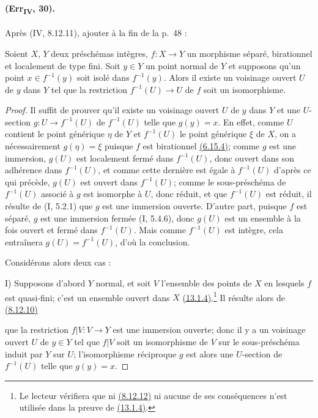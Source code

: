 \paragraph{(Err\textsubscript{IV}, 30).}
Après (IV, 8.12.11), ajouter à la fin de la p.~48 :

\begin{corollary}[8.12.12]
\label{IV.8.12.12}
Soient $X$, $Y$ deux préschémas intègres,
$f:X\to Y$ un morphisme séparé, birationnel et localement de type fini.
Soit $y\in Y$ un point normal de $Y$ et supposons qu'un point
$x\in f^{-1}(y)$ soit isolé dans $f^{-1}(y)$. Alors il existe un
voisinage ouvert $U$ de $y$ dans $Y$ tel que la restriction
$f^{-1}(U)\to U$ de $f$ soit un isomorphisme.
\end{corollary}

\begin{proof}
Il suffit de prouver qu'il existe un voisinage ouvert $U$ de $y$ dans
$Y$ et une $U$-section $g:U\to f^{-1}(U)$ de $f^{-1}(U)$ telle que
$g(y)=x$. En effet, comme $U$ contient le point générique $\eta$ de
$Y$ et $f^{-1}(U)$ le point générique $\xi$ de $X$, on a
nécessairement $g(\eta)=\xi$ puisque $f$ est birationnel
{\hyperlink{ega4.c04.statement.6-15-4}{(6.15.4)}}; comme $g$ est une
immersion, $g(U)$ est localement fermé dans $f^{-1}(U)$, donc ouvert
dans son adhérence dans $f^{-1}(U)$, et comme cette dernière est égale
à $f^{-1}(U)$ d'après ce qui précède, $g(U)$ est ouvert dans
$f^{-1}(U)$; comme le sous-préschéma de $f^{-1}(U)$ associé à $g$ est
isomorphe à $U$, donc réduit, et que $f^{-1}(U)$ est réduit, il résulte
de (I, 5.2.1) que $g$ est une immersion ouverte. D'autre part, puisque
$f$ est séparé, $g$ est une immersion fermée (I, 5.4.6), donc $g(U)$
est un ensemble à la fois ouvert et fermé dans $f^{-1}(U)$. Mais comme
$f^{-1}(U)$ est intègre, cela entraînera $g(U)=f^{-1}(U)$, d'où la
conclusion.

Considérons alors deux cas :

\textup{I)} Supposons d'abord $Y$ normal, et soit $V$ l'ensemble des
points de $X$ en lesquels $f$ est quasi-fini; c'est un ensemble ouvert
dans $X$ {\hyperlink{ega4.c04.cor.13-1-4}{(13.1.4)}}.\footnote{Le
lecteur vérifiera que ni {\hyperlink{ega4.c04.cor.8-12-12}{(8.12.12)}}
ni aucune de ses conséquences n'est utilisée dans la preuve de
{\hyperlink{ega4.c04.cor.13-1-4}{(13.1.4)}}.} Il résulte alors de
{\hyperlink{ega4.c04.cor.8-12-10}{(8.12.10)}}

que la restriction $f|V:V\to Y$ est une immersion ouverte; donc il y a
un voisinage ouvert $U$ de $y\in Y$ tel que $f|V$ soit un isomorphisme
de $V$ sur le sous-préschéma induit par $Y$ sur $U$; l'isomorphisme
réciproque $g$ est alors une $U$-section de $f^{-1}(U)$ telle que
$g(y)=x$.


\end{proof}
